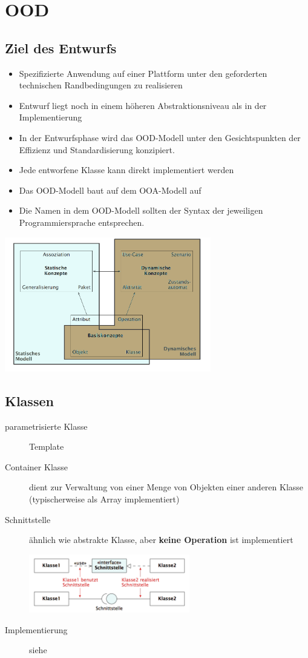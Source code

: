 \section{OOD}
\subsection{Ziel des Entwurfs}
  \begin{itemize}[leftmargin=0.5cm]
    \item Spezifizierte Anwendung auf einer Plattform unter den geforderten technischen
      Randbedingungen zu realisieren
    \item Entwurf liegt noch in einem höheren Abstraktionsniveau als in der Implementierung
    \item In der Entwurfsphase wird das OOD-Modell unter den Gesichtspunkten
      der Effizienz und Standardisierung konzipiert.
    \item Jede entworfene Klasse kann direkt implementiert werden
    \item Das OOD-Modell baut auf dem OOA-Modell auf
    \item Die Namen in dem OOD-Modell sollten der Syntax der jeweiligen Programmiersprache
      entsprechen.
  \end{itemize}

  \parbox{9cm}{\includegraphics[width=9cm]{./bilder/Konzepte.png}}
  
\subsection{Klassen }
  \begin{description}
    \item[parametrisierte Klasse]
      Template
    \item[Container Klasse]
      dient zur Verwaltung von einer Menge von Objekten einer anderen Klasse
      (typischerweise als Array implementiert)
    \item[Schnittstelle ]
      \parbox{5cm}{ähnlich wie abstrakte Klasse, aber \textbf{keine Operation} ist implementiert}
      \hspace{0.5cm}
      \parbox{7cm}{\includegraphics[width=7cm]{./bilder/Schnittstelle.png}}
    \item[Implementierung]
      siehe 
  \end{description}
  

